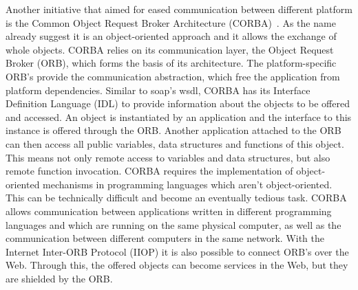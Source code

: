 Another initiative that aimed for eased communication between different platform is the Common Object Request Broker Architecture (\textrm{CORBA})~\cite{dec1991common}.
As the name already suggest it is an object-oriented approach and it allows the exchange of whole objects.
\textrm{CORBA} relies on its communication layer, the Object Request Broker (\textrm{ORB}), which forms the basis of its architecture.
The platform-specific \textrm{ORB}'s provide the communication abstraction, which free the application from platform dependencies.
Similar to \textrm{\acrshort{soap}}'s \textrm{\acrshort{wsdl}}, \textrm{CORBA} has its Interface Definition Language (\textrm{IDL}) to provide information about the objects to be offered and accessed.
An object is instantiated by an application and the interface to this instance is offered through the \textrm{ORB}.
Another application attached to the \textrm{ORB} can then access all public variables, data structures and functions of this object.
This means not only remote access to variables and data structures, but also remote function invocation.
\textrm{CORBA} requires the implementation of object-oriented mechanisms in programming languages which aren't object-oriented.
This can be technically difficult and become an eventually tedious task.
\textrm{CORBA} allows communication between applications written in different programming languages and which are running on the same physical computer, as well as the communication between different computers in the same network.
With the Internet Inter-\textrm{ORB} Protocol (\textrm{IIOP}) it is also possible to connect \textrm{ORB}'s over the Web.
Through this, the offered objects can become services in the Web, but they are shielded by the \textrm{ORB}.

